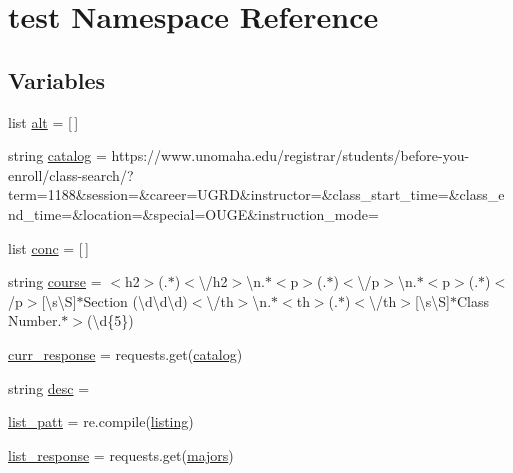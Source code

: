 \hypertarget{namespacetest}{}\section{test Namespace Reference}
\label{namespacetest}
\subsection*{Variables}
\begin{DoxyCompactItemize}
\item 
list \mbox{\hyperlink{namespacetest_a292455049888b41870b9f53769925dc5}{alt}} = \mbox{[}$\,$\mbox{]}
\item 
string \mbox{\hyperlink{namespacetest_a558bb89ee60dd0d0cdc82c89fd7db764}{catalog}} = \textquotesingle{}https\+://www.\+unomaha.\+edu/registrar/students/before-\/you-\/enroll/class-\/search/?term=1188\&session=\&career=U\+G\+RD\&instructor=\&class\+\_\+start\+\_\+time=\&class\+\_\+end\+\_\+time=\&location=\&special=O\+U\+GE\&instruction\+\_\+mode=\textquotesingle{}
\item 
list \mbox{\hyperlink{namespacetest_a8d2404d0b6835bb0517fc1271e2b0b3c}{conc}} = \mbox{[}$\,$\mbox{]}
\item 
string \mbox{\hyperlink{namespacetest_aef2c5d7bd8ec9fc2ba0447263d36cbc5}{course}} = \textquotesingle{}$<$h2$>$(.$\ast$)$<$\textbackslash{}/h2$>$\textbackslash{}n.$\ast$$<$p$>$(.$\ast$)$<$\textbackslash{}/p$>$\textbackslash{}n.$\ast$$<$p$>$(.$\ast$)$<$/p$>$\mbox{[}\textbackslash{}s\textbackslash{}S\mbox{]}$\ast$Section (\textbackslash{}d\textbackslash{}d\textbackslash{}d)$<$\textbackslash{}/th$>$\textbackslash{}n.$\ast$$<$th$>$(.$\ast$)$<$\textbackslash{}/th$>$\mbox{[}\textbackslash{}s\textbackslash{}S\mbox{]}$\ast$Class Number.$\ast$$>$(\textbackslash{}d\{5\})\textquotesingle{}
\item 
\mbox{\hyperlink{namespacetest_aebc4c0e0da8bb665062857db50b59f27}{curr\+\_\+response}} = requests.\+get(\mbox{\hyperlink{namespacetest_a558bb89ee60dd0d0cdc82c89fd7db764}{catalog}})
\item 
string \mbox{\hyperlink{namespacetest_a07d6347d922b6f2fe5cfdd79f0a8ec7c}{desc}} = \textquotesingle{}\textquotesingle{}
\item 
\mbox{\hyperlink{namespacetest_a2463c97fe84ef96959bb4270464142e8}{list\+\_\+patt}} = re.\+compile(\mbox{\hyperlink{namespacetest_aa935a14b351dde1a77f8a9fdf62ab9e4}{listing}})
\item 
\mbox{\hyperlink{namespacetest_a8b6b8ae2b5255348f5053214f923315a}{list\+\_\+response}} = requests.\+get(\mbox{\hyperlink{namespacetest_aac866171a3a2f476bc4ee9c246332d20}{majors}})

\end{DoxyCompactItemize}

